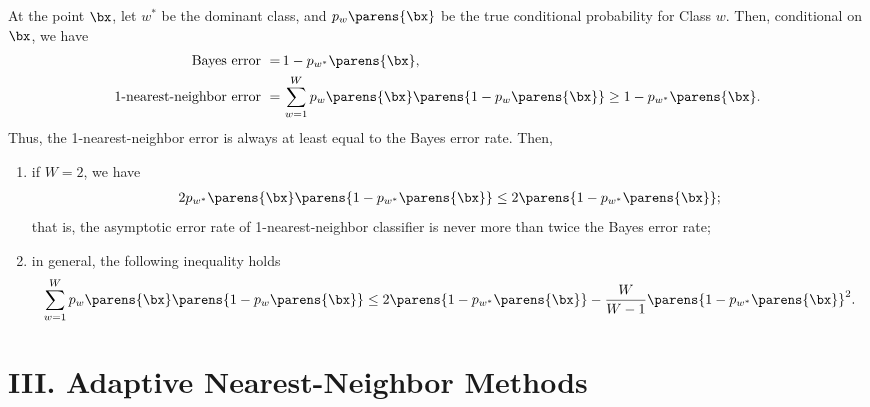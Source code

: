 \documentclass[12pt]{article}
\begin{document}
\begin{enumerate}[label=\textbf{\arabic*.}]
	At the point $\bx$, let $w^*$ be the dominant class, and $p_w \parens{\bx}$ be the true conditional probability for Class $w$. Then, conditional on $\bx$, we have 
	\begin{align*}
		\text{Bayes error } = & \, 1 - p_{w^*} \parens{\bx}, \\ 
		\text{1-nearest-neighbor error } = & \, \sum_{w=1}^W p_w \parens{\bx} \parens{1 - p_w \parens{\bx}} \ge 1 - p_{w^*} \parens{\bx}. 
	\end{align*}
	Thus, the 1-nearest-neighbor error is always at least equal to the Bayes error rate. Then, 
	\begin{enumerate}
		\item if $W=2$, we have 
		\begin{align}
			2 p_{w^*} \parens{\bx} \parens{1 - p_{w^*} \parens{\bx}} \le 2 \parens{1 - p_{w^*} \parens{\bx}}; 
		\end{align}
		that is, the asymptotic error rate of 1-nearest-neighbor classifier is never more than twice the Bayes error rate; 
		\item in general, the following inequality holds 
		\begin{align}
			\sum_{w=1}^W p_w \parens{\bx} \parens{1 - p_w \parens{\bx}} \le 2 \parens{1 - p_{w^*} \parens{\bx}} - \frac{W}{W-1} \parens{1 - p_{w^*} \parens{\bx}}^2. 
		\end{align}
	\end{enumerate}

\end{enumerate}


\section*{III. Adaptive Nearest-Neighbor Methods}
\end{document}
